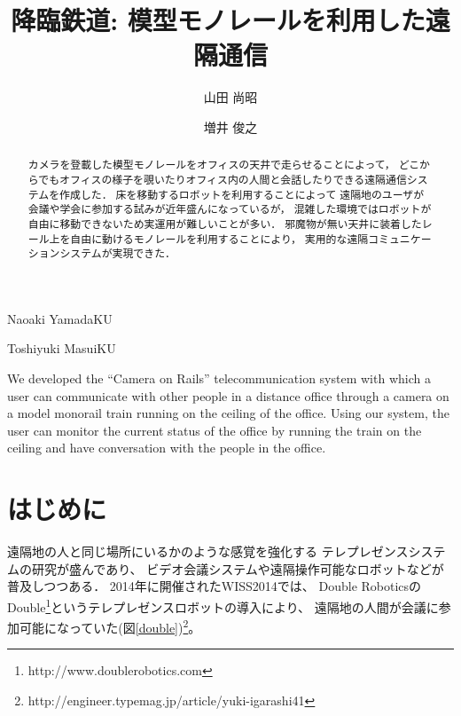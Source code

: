 \documentclass[submit,techreq]{ipsj}
\begin{document}
\title{降臨鉄道: 模型モノレールを利用した遠隔通信}


\author{山田 尚昭}{Naoaki Yamada}{KU}
\author{増井 俊之}{Toshiyuki Masui}{KU}

\begin{abstract}
カメラを登載した模型モノレールをオフィスの天井で走らせることによって，
どこからでもオフィスの様子を覗いたりオフィス内の人間と会話したりできる遠隔通信システムを作成した．
床を移動するロボットを利用することによって
遠隔地のユーザが会議や学会に参加する試みが近年盛んになっているが，
混雑した環境ではロボットが自由に移動できないため実運用が難しいことが多い．
邪魔物が無い天井に装着したレール上を自由に動けるモノレールを利用することにより，
実用的な遠隔コミュニケーションシステムが実現できた．
\end{abstract}

\begin{eabstract}
We developed the ``Camera on Rails'' telecommunication system with
which a user can communicate with other people in a
distance office through a camera on a model monorail train running on the ceiling
of the office. Using our system, the user can monitor the current status
of the office by running the train on the ceiling and have
conversation with the people in the office.
\end{eabstract}

\maketitle

\section{はじめに}

遠隔地の人と同じ場所にいるかのような感覚を強化する
テレプレゼンスシステムの研究が盛んであり、
ビデオ会議システムや遠隔操作可能なロボットなどが普及しつつある．
%
2014年に開催されたWISS2014では、
Double RoboticsのDouble\footnote{
  \textsf{http://www.doublerobotics.com}
}というテレプレゼンスロボットの導入により、
遠隔地の人間が会議に参加可能になっていた(図\ref{double})\footnote{
  \textsf{http://engineer.typemag.jp/article/yuki-igarashi41}
}。
\end{document}
